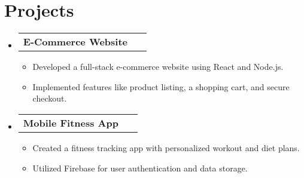 \documentclass[letterpaper,11pt]{article}
\makeatletter
\newcommand{\resumeItem}[1]{
    \item\small{
      {#1 \vspace{-2pt}}
    }
  }
\newcommand{\resumeProjectHeading}[2]{
      \item
      \begin{tabular*}{0.97\textwidth}{l@{\extracolsep{\fill}}r}
        \small#1 & #2 \
      \end{tabular*}\vspace{-7pt}}
\newcommand{\resumeSubHeadingListStart}{\begin{itemize}[leftmargin=0.15in, label={}]}
\newcommand{\resumeSubHeadingListEnd}{\end{itemize}}
\newcommand{\resumeItemListStart}{\begin{itemize}}
\newcommand{\resumeItemListEnd}{\end{itemize}\vspace{-5pt}}
\makeatother
\begin{document}
      \section{Projects}
      \resumeSubHeadingListStart
          \resumeProjectHeading
            {\textbf{E-Commerce Website}}{}\resumeItemListStart\resumeItem{Developed a full-stack e-commerce website using React and Node.js.}
\resumeItem{Implemented features like product listing, a shopping cart, and secure checkout.}
\resumeItemListEnd
          \resumeProjectHeading
            {\textbf{Mobile Fitness App}}{}\resumeItemListStart\resumeItem{Created a fitness tracking app with personalized workout and diet plans.}
\resumeItem{Utilized Firebase for user authentication and data storage.}
\resumeItemListEnd
      \resumeSubHeadingListEnd
    
\end{document}
